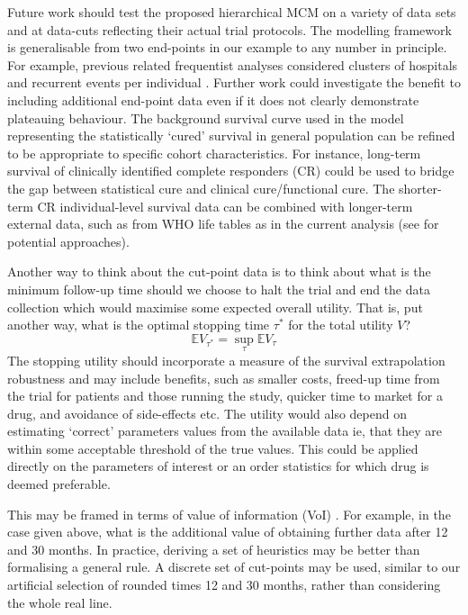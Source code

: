 \documentclass[AMA,STIX1COL]{WileyNJD-v2}
\begin{document}
Future work should test the proposed hierarchical MCM on a variety of data sets and at data-cuts reflecting their actual trial protocols.
The modelling framework is generalisable from two end-points in our example to any number in principle.
For example, previous related frequentist analyses considered clusters of hospitals and recurrent events per individual \citep{Lai2008, Lai2009}.
Further work could investigate the benefit to including additional end-point data even if it does not clearly demonstrate plateauing behaviour.
The background survival curve used in the model representing the statistically `cured' survival in general population can be refined to be appropriate to specific cohort characteristics. For instance, long-term survival of clinically identified complete responders (CR) could be used to bridge the gap between statistical cure and clinical cure/functional cure. The shorter-term CR individual-level survival data can be combined with longer-term external data, such as from WHO life tables as in the current analysis (see \citep{Jackson2017} for potential approaches).

Another way to think about the cut-point data is to think about what is the minimum follow-up time should we choose to halt the trial and end the data collection which would maximise some expected overall utility.
That is, put another way, what is the optimal stopping time $\tau^*$ for the total utility $V$?
$$
\mathbb{E} V_{\tau^*} = \sup_{\tau} \mathbb{E} V_{\tau}
$$
The stopping utility should incorporate a measure of the survival extrapolation robustness and may include benefits, such as smaller costs, freed-up time from the trial for patients and those running the study, quicker time to market for a drug, and avoidance of side-effects etc.
The utility would also depend on estimating `correct' parameters values from the available data ie, that they are within some acceptable threshold of the true values.
This could be applied directly on the parameters of interest or an order statistics for which drug is deemed preferable.

This may be framed in terms of value of information (VoI) \citep{Heath2017}.
For example, in the case given above, what is the additional value of obtaining further data after 12 and 30 months.
In practice, deriving a set of heuristics may be better than formalising a general rule.
A discrete set of cut-points may be used, similar to our artificial selection of rounded times 12 and 30 months, rather than considering the whole real line.
\end{document}
